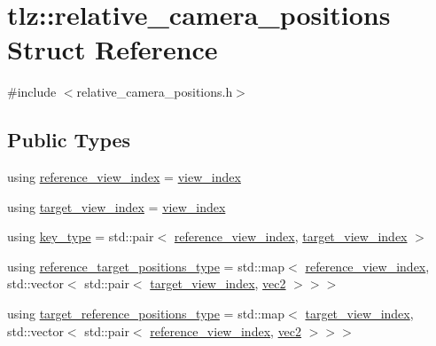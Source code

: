 \hypertarget{structtlz_1_1relative__camera__positions}{}\section{tlz\+:\+:relative\+\_\+camera\+\_\+positions Struct Reference}
\label{structtlz_1_1relative__camera__positions}


{\ttfamily \#include $<$relative\+\_\+camera\+\_\+positions.\+h$>$}

\subsection*{Public Types}
\begin{DoxyCompactItemize}
\item 
using \hyperlink{structtlz_1_1relative__camera__positions_ae555c11fb699f3f9259a580f7e993020}{reference\+\_\+view\+\_\+index} = \hyperlink{structtlz_1_1view__index}{view\+\_\+index}
\item 
using \hyperlink{structtlz_1_1relative__camera__positions_a8af150a7c8a06957851bd43e08aa4891}{target\+\_\+view\+\_\+index} = \hyperlink{structtlz_1_1view__index}{view\+\_\+index}
\item 
using \hyperlink{structtlz_1_1relative__camera__positions_a131cad34840b596589a44dfdc079ff6c}{key\+\_\+type} = std\+::pair$<$ \hyperlink{structtlz_1_1relative__camera__positions_ae555c11fb699f3f9259a580f7e993020}{reference\+\_\+view\+\_\+index}, \hyperlink{structtlz_1_1relative__camera__positions_a8af150a7c8a06957851bd43e08aa4891}{target\+\_\+view\+\_\+index} $>$
\item 
using \hyperlink{structtlz_1_1relative__camera__positions_add616a43c418d61c9945d71ac7d403de}{reference\+\_\+target\+\_\+positions\+\_\+type} = std\+::map$<$ \hyperlink{structtlz_1_1relative__camera__positions_ae555c11fb699f3f9259a580f7e993020}{reference\+\_\+view\+\_\+index}, std\+::vector$<$ std\+::pair$<$ \hyperlink{structtlz_1_1relative__camera__positions_a8af150a7c8a06957851bd43e08aa4891}{target\+\_\+view\+\_\+index}, \hyperlink{namespacetlz_ae192989bfbe6c700ac84d2a8cf05ebb4}{vec2} $>$$>$$>$
\item 
using \hyperlink{structtlz_1_1relative__camera__positions_a22e8f4b822109a48c870edb85d37a24b}{target\+\_\+reference\+\_\+positions\+\_\+type} = std\+::map$<$ \hyperlink{structtlz_1_1relative__camera__positions_a8af150a7c8a06957851bd43e08aa4891}{target\+\_\+view\+\_\+index}, std\+::vector$<$ std\+::pair$<$ \hyperlink{structtlz_1_1relative__camera__positions_ae555c11fb699f3f9259a580f7e993020}{reference\+\_\+view\+\_\+index}, \hyperlink{namespacetlz_ae192989bfbe6c700ac84d2a8cf05ebb4}{vec2} $>$$>$$>$
\end{DoxyCompactItemize}
